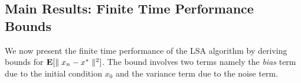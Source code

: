 \subsection{Main Results: Finite Time Performance Bounds}\label{main result}
We now present the finite time performance of the LSA algorithm by deriving bounds for $\mathbf{E}[\parallel x_n-x^*\parallel^2]$. The bound involves two terms namely the \emph{bias} term due to the initial condition $x_0$ and the variance term due to the noise term. 

